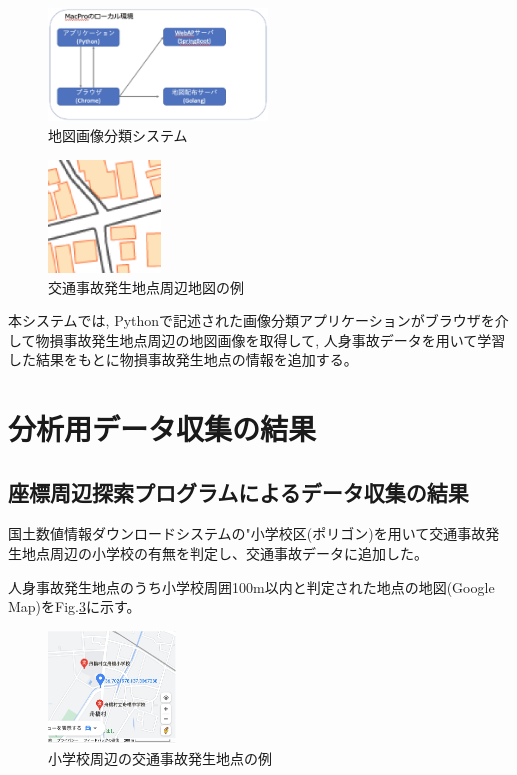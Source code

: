 \documentclass[a4j,8.5pt, twocolumn,fleqn]{jbook}
\begin{document}
\begin{figure}[htb]
    \centering
    \includegraphics[height=30mm]{images/mapclassification_server.eps}
    \vspace{-3mm}
    \caption{地図画像分類システム}
    \label{classifications}
\end{figure}

\begin{figure}[htb]
    \centering
    \includegraphics[height=30mm]{images/tiriixn.eps}
    \vspace{-3mm}
    \caption{交通事故発生地点周辺地図の例}
    \label{tiriixn}
\end{figure}

本システムでは, Pythonで記述された画像分類アプリケーションがブラウザを介して物損事故発生地点周辺の地図画像を取得して, 人身事故データを用いて学習した結果をもとに物損事故発生地点の情報を追加する。

\section{分析用データ収集の結果}
\subsection{座標周辺探索プログラムによるデータ収集の結果}
国土数値情報ダウンロードシステムの"小学校区(ポリゴン)を用いて交通事故発生地点周辺の小学校の有無を判定し、交通事故データに追加した。

人身事故発生地点のうち小学校周囲100m以内と判定された地点の地図(Google Map)をFig.\ref{shougakkou_gmap}に示す。

\begin{figure}[htb]
    \centering
    \includegraphics[height=30mm]{images/shougakkou_gmap.eps}
    \vspace{-3mm}
    \caption{小学校周辺の交通事故発生地点の例}
    \label{shougakkou_gmap}
\end{figure}
\end{document}
